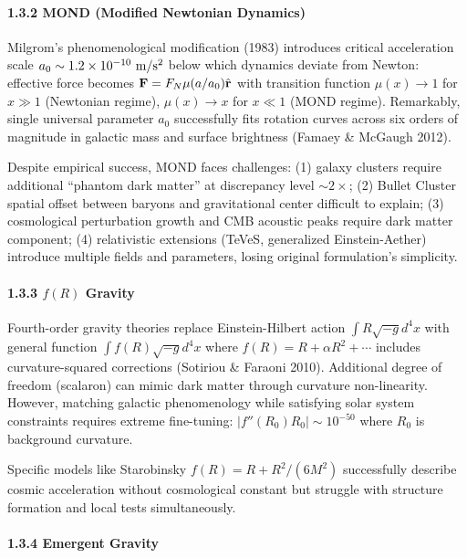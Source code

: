 \documentclass[11pt,a4paper]{article}
\begin{document}
\hypertarget{mond-modified-newtonian-dynamics}{%
\paragraph{1.3.2 MOND (Modified Newtonian
Dynamics)}\label{mond-modified-newtonian-dynamics}}

Milgrom's phenomenological modification (1983) introduces critical
acceleration scale \(a_0 \sim 1.2 \times 10^{-10}~{\rm m/s^2}\) below
which dynamics deviate from Newton: effective force becomes
\({\bf F} = F_N \mu(a/a_0)\hat{{\bf r}}\) with transition function
\(\mu(x) \to 1\) for \(x \gg 1\) (Newtonian regime), \(\mu(x) \to x\)
for \(x \ll 1\) (MOND regime). Remarkably, single universal parameter
\(a_0\) successfully fits rotation curves across six orders of magnitude
in galactic mass and surface brightness (Famaey \& McGaugh 2012).

Despite empirical success, MOND faces challenges: (1) galaxy clusters
require additional ``phantom dark matter'' at discrepancy level
\(\sim 2\times\); (2) Bullet Cluster spatial offset between baryons and
gravitational center difficult to explain; (3) cosmological perturbation
growth and CMB acoustic peaks require dark matter component; (4)
relativistic extensions (TeVeS, generalized Einstein-Aether) introduce
multiple fields and parameters, losing original formulation's
simplicity.

\hypertarget{fr-gravity}{%
\paragraph{\texorpdfstring{1.3.3 \(f(R)\)
Gravity}{1.3.3 f(R) Gravity}}\label{fr-gravity}}

Fourth-order gravity theories replace Einstein-Hilbert action
\(\int R\sqrt{-g}d^4x\) with general function \(\int f(R)\sqrt{-g}d^4x\)
where \(f(R) = R + \alpha R^2 + \cdots\) includes curvature-squared
corrections (Sotiriou \& Faraoni 2010). Additional degree of freedom
(scalaron) can mimic dark matter through curvature non-linearity.
However, matching galactic phenomenology while satisfying solar system
constraints requires extreme fine-tuning:
\(|f''(R_0)R_0| \sim 10^{-50}\) where \(R_0\) is background curvature.

Specific models like Starobinsky \(f(R) = R + R^2/(6M^2)\) successfully
describe cosmic acceleration without cosmological constant but struggle
with structure formation and local tests simultaneously.

\hypertarget{emergent-gravity}{%
\paragraph{1.3.4 Emergent Gravity}\label{emergent-gravity}}
\end{document}
